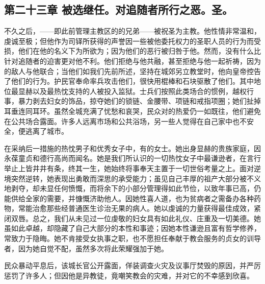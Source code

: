 
\subsection{第二十三章 被选继任。对追随者所行之恶。圣。}

不久之后，——即此前管理主教区的的兄弟——被祝圣为主教。他性情非常温和，虔诚至极；但他作为司铎所获得的声誉因一些被他委托权力的圣职人员的行为而受损，他们在他的名义下为所欲为；因为他们的恶行被归咎于他。然而，没有什么比针对追随者的迫害更对他不利。他们拒绝与他共融，甚至拒绝与他一起祈祷，因为的敌人与他联合；当他们如我们先前所述，坚持在城郊另立教堂时，他向皇帝控告了他们的行为。护民官奉命率兵攻击他们，很快用棍棒和石块驱散了他们。其中地位最显赫以及最热忱支持的人被投入监狱。士兵们按照此类场合的惯例，越权行事，暴力剥去妇女的饰品，掠夺她们的锁链、金腰带、项链和戒指项圈；她们扯掉耳垂连同耳环。虽然全城充满了忧愁和哀哭，民众对的热爱仍一如既往，他们避免在公共场合露面。许多人远离市场和公共浴场，另一些人觉得在自己家中也不安全，便逃离了城市。\par

在采纳后一措施的热忱男子和优秀女子中，有的女士。她出身显赫的贵族家庭，因永葆童贞和德行高尚而闻名。她是我们所认识的一切热忱女子中最谦逊者，在言行举止上皆井井有条，终其一生，她始终将事奉天主置于一切世俗考量之上。面对逆境突然逆转，她表现出勇敢而深思的承受能力；虽见自己丰厚的祖产大部分被不义地剥夺，却未显任何愤慨，而将余下的小部分管理得如此节俭，以致年事已高，仍能供给全家的需要，并慷慨济助他人。因她性喜人道，也为贫病者之需备办各种药物，常能治愈那些经普通医生诊治无果的病人。她以虔诚的力量获得最佳成效，紧闭双唇。总之，我们从未见过一位虔敬的妇女具有如此礼仪、庄重及一切美德。她虽如此卓越，却隐藏了自己大部分的本性和事迹；因她本性谦逊且富有哲学修养，常致力于隐晦。她不肯接受女执事之职，也不愿担任奉献于教会服务的贞女的训导者，因为她自觉不配，虽然多次将此荣耀强加于她。\par

民众暴动平息后，该城长官公开露面，佯装调查火灾及议事厅焚毁的原因，并严厉惩罚了许多人；但因他是异教徒，竟嘲笑教会的灾难，并对它的不幸感到欣喜。\par


